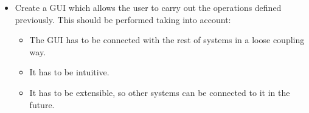 \begin{itemize}
  
  \item Create a GUI which allows the user to carry out the operations defined
  previously. This should be performed taking into account:
  \begin{itemize}
    \item The GUI has to be connected with the rest of systems in a loose
    coupling way.
    \item It has to be intuitive.
    \item It has to be extensible, so other systems can be connected to it in
    the future.
  \end{itemize}
\end{itemize}
